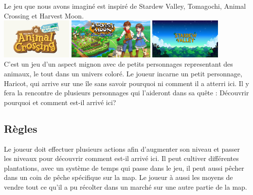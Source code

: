 \documentclass{article}
\begin{document}
Le jeu que nous avons imaginé est inspiré de Stardew Valley, Tomagochi, Animal Crossing et Harvest Moon. 
\\
\includegraphics[height = 2cm]{AClogo.png}
\hspace{50pt}
\includegraphics[height = 2cm]{HMlogo.jpg}
\hspace{50pt}
\includegraphics[height = 2cm]{SVlogo.jpeg} 
\\
C'est un jeu d'un aspect mignon avec de petits personnages representant des animaux, le tout dans un univers coloré. Le joueur incarne un petit personnage, Haricot, qui arrive sur une île sans savoir pourquoi ni comment il a atterri ici. Il y fera la rencontre de plusieurs personnages qui l'aideront dans sa quête : Découvrir pourquoi et comment est-il arrivé ici? 
\\

\subsection{Règles}

Le joueur doit effectuer plusieurs actions afin d'augmenter son niveau et passer les niveaux pour découvrir comment est-il arrivé ici. Il peut cultiver différentes plantations, avec un système de temps qui passe dans le jeu, il peut aussi pêcher dans un coin de pêche spécifique sur la map. Le joueur à aussi les moyens de vendre tout ce qu'il a pu récolter dans un marché sur une autre partie de la map.
\\
\end{document}
